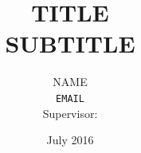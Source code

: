 \documentclass{scrbook}
\begin{document}
\def \ColourPDF {Images/ku-farve.pdf}
\def \TitlePDF   {Images/ku-en.pdf}



\subject{ 
  \vspace{3.5cm}
  \scriptsize{A thesis presented to the Faculty of Humanities in partial fulfillment of the requirements for the degree} \\
  \Large{Master of Science in IT \& Cognition} \\}

\title{
  \Huge{TITLE}\\
  \Large{SUBTITLE}
}



\author{
  \Large{NAME} \\
  \texttt{EMAIL}
  \vspace{1.5cm} \\
  \large{Supervisor: }
}
\date{July 2016}


\end{document}
